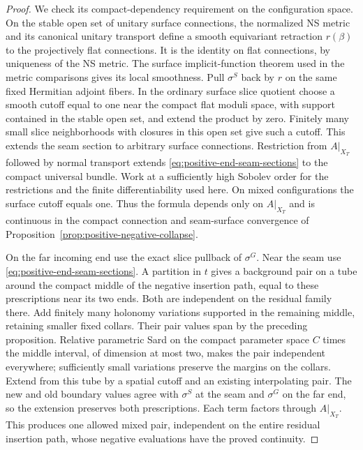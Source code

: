 \documentclass[11pt]{amsart}
\theoremstyle{definition}
\theoremstyle{remark}
\theoremstyle{plain}
\begin{document}
\begin{proof}
We check its compact-dependency requirement on the configuration
space. On the stable open set of unitary surface connections,
the normalized NS metric and its canonical unitary transport
define a smooth equivariant retraction $r(\beta)$ to the
projectively flat connections. It is the identity on flat
connections, by uniqueness of the NS metric. The surface
implicit-function theorem used in the metric comparisons
gives its local smoothness. Pull $\sigma^S$ back by $r$
on the same fixed Hermitian adjoint fibers. In the ordinary
surface slice quotient choose a smooth cutoff equal to one
near the compact flat moduli space, with support contained
in the stable open set, and extend the product by zero.
Finitely many small slice neighborhoods with closures in
this open set give such a cutoff. This extends the seam
section to arbitrary surface connections. Restriction from
$A|_{X_T}$ followed by normal transport extends
\eqref{eq:positive-end-seam-sections} to the compact universal
bundle. Work at a sufficiently high Sobolev order for the
restrictions and the finite differentiability used here.
On mixed configurations the surface cutoff equals one.
Thus the formula depends only on $A|_{X_T}$ and is continuous
in the compact connection and seam-surface convergence of
Proposition~\ref{prop:positive-negative-collapse}.

On the far incoming end use the exact slice pullback of
$\sigma^G$. Near the seam use
\eqref{eq:positive-end-seam-sections}. A partition in $t$
gives a background pair on a tube around the compact middle
of the negative insertion path, equal to these prescriptions
near its two ends. Both are independent on the residual
family there. Add finitely many holonomy variations supported
in the remaining middle, retaining smaller fixed collars.
Their pair values span by the preceding proposition.
Relative parametric Sard on the compact parameter space
$C$ times the middle interval, of dimension at most two,
makes the pair independent everywhere; sufficiently small
variations preserve the margins on the collars.
Extend from this tube by a spatial cutoff and an existing
interpolating pair. The new and old boundary values agree
with $\sigma^S$ at the seam and $\sigma^G$ on the far end,
so the extension preserves both prescriptions. Each term
factors through $A|_{X_T}$. This produces one allowed mixed
pair, independent on the entire residual insertion path,
whose negative evaluations have the proved continuity.


\end{proof}
\end{document}
